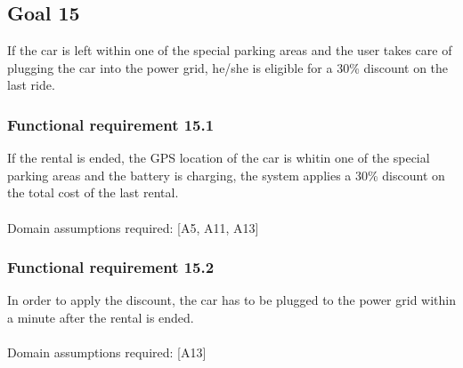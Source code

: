 \subsection{Goal 15}
If the car is left within one of the special parking areas and the user takes care of plugging the car into the power grid, he/she is eligible for a 30\% discount on the last ride.

\setcounter{secnumdepth}{3}
\subsubsection{Functional requirement 15.1}
If the rental is ended, the GPS location of the car is whitin one of the special parking areas and the battery is charging, the system applies a 30\% discount on the total cost of the last rental.\\~\\
\noindent Domain assumptions required: [A5, A11, A13]

\subsubsection{Functional requirement 15.2}
In order to apply the discount, the car has to be plugged to the power grid within a minute after the rental is ended.\\~\\
\noindent Domain assumptions required: [A13]
